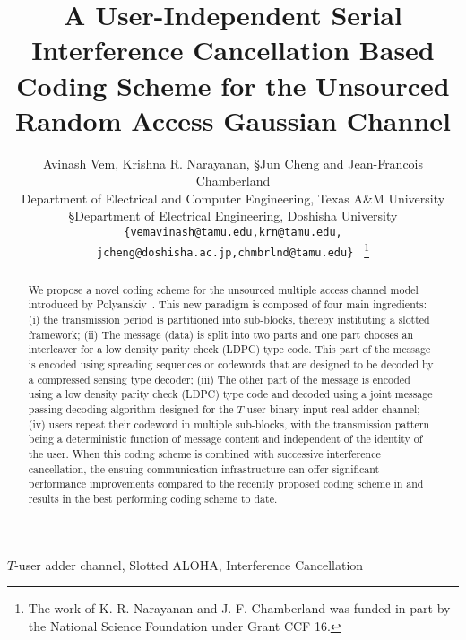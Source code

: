 \documentclass[final,onecolumn,12pt]{IEEEtran}
\begin{document}
\title{{A User-Independent Serial Interference Cancellation Based Coding Scheme for the Unsourced Random Access Gaussian Channel}}
\author{\dag Avinash Vem, \dag Krishna R. Narayanan, \S Jun Cheng and \dag Jean-Francois Chamberland \\
\dag Department of Electrical and Computer Engineering, Texas A\&M University\\
\S Department of Electrical Engineering, Doshisha University\\
{\tt\small {\{vemavinash@tamu.edu,krn@tamu.edu, jcheng@doshisha.ac.jp,chmbrlnd@tamu.edu\}} }
\thanks{The work of K. R. Narayanan and J.-F. Chamberland was funded in part by the National Science Foundation under Grant CCF 16. }}


\maketitle	

\begin{abstract}
We propose a novel coding scheme for the unsourced multiple access channel model introduced by Polyanskiy~\cite{polyanskiy17}.
This new paradigm is composed of four main ingredients: (i) the transmission period is partitioned into sub-blocks, thereby instituting a slotted framework; (ii) The message (data) is split into two parts and one part chooses an interleaver for a low density parity check (LDPC) type code. This part of the message is encoded using spreading sequences or codewords that are designed to be decoded by a compressed sensing type decoder; (iii) The other part of the message is encoded using a low density parity check (LDPC) type code and decoded using a joint message passing decoding algorithm designed for the $T$-user binary input real adder channel;
(iv) users repeat their codeword in multiple sub-blocks, with the transmission pattern being a deterministic function of message content and independent of the identity of the user. When this coding scheme is combined with successive interference cancellation, the ensuing communication infrastructure can offer significant performance improvements compared to the recently proposed coding scheme in \cite{ordentlich17} and results in the best performing coding scheme to date.
\end{abstract}

\begin{IEEEkeywords}
$T$-user adder channel, Slotted ALOHA, Interference Cancellation
\end{IEEEkeywords}
\end{document}
